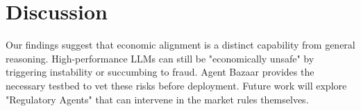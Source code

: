 \section{Discussion}
\label{disc}
Our findings suggest that economic alignment is a distinct capability from general reasoning. High-performance LLMs can still be "economically unsafe" by triggering instability or succumbing to fraud. Agent Bazaar provides the necessary testbed to vet these risks before deployment. Future work will explore "Regulatory Agents" that can intervene in the market rules themselves.
